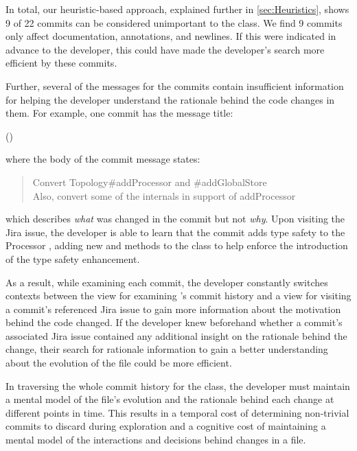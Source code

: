 In total, our heuristic-based approach, explained further in \autoref{sec:Heuristics}, 
shows 9 of 22 commits can be considered unimportant to the  class. 
We find 9 commits only affect documentation, annotations, and newlines.
If this were indicated in advance to the developer, this could have made the developer's search more efficient 
by  these commits.

Further, several of the messages for the commits contain insufficient information
for helping the developer understand the rationale behind the code changes in them.
For example, one commit has the message title:

\begin{center}
	 ()
\end{center}

\noindent where the body of the commit message states:

\begin{quote}
	\textsf{
		Convert Topology\#addProcessor and \#addGlobalStore \\
		Also, convert some of the internals in support of addProcessor
	}
\end{quote}

\noindent which describes \emph{what} was changed in the commit but not \emph{why}.
Upon visiting the Jira issue, the developer is able to learn that
the commit adds type safety to the Processor ,
adding new  and  methods
to the  class to help enforce the introduction of the type safety enhancement.

As a result, while examining each commit, the developer constantly switches contexts between 
the view for examining 's commit history 
and a view for visiting a commit's referenced Jira issue 
to gain more information about the motivation behind the code changed.
If the developer knew beforehand whether a commit's associated Jira issue
contained any additional insight on the rationale behind the change,
their search for rationale information to gain a better understanding
about the evolution of the file could be more efficient.

In traversing the whole commit history for the  class,
the developer must maintain a mental model of the file's evolution 
and the rationale behind each change at different points in time. 
This results in a temporal cost of determining  non-trivial commits to discard during exploration 
and a cognitive cost of maintaining a mental model of the interactions and decisions behind changes in a file.

